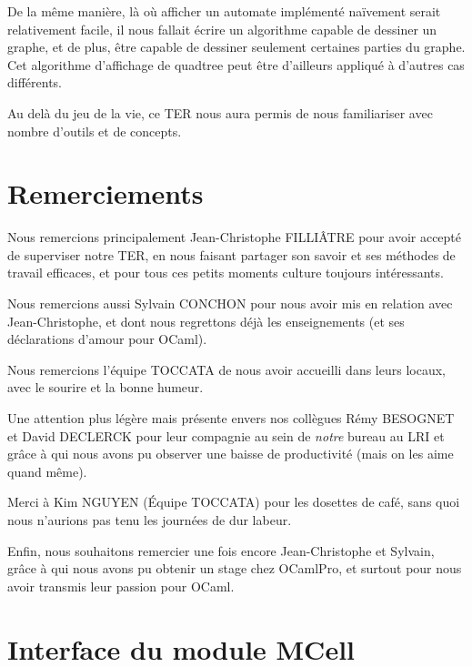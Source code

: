 \documentclass[a4paper,12pt]{report}
\begin{document}
\medskip

De la même manière, là où afficher un automate implémenté naïvement
serait relativement facile, il nous fallait écrire un algorithme
capable de dessiner un graphe, et de plus, être capable de dessiner
seulement certaines parties du graphe. Cet algorithme d'affichage de
quadtree peut être d'ailleurs appliqué à d'autres cas différents.

Au delà du jeu de la vie, ce TER nous aura permis de nous familiariser
avec nombre d'outils et de concepts.

\chapter{Remerciements}

Nous remercions principalement Jean-Christophe FILLIÂTRE pour avoir
accepté de superviser notre TER, en nous faisant partager son savoir
et ses méthodes de travail efficaces, et pour tous ces petits moments
culture toujours intéressants.

\medskip

Nous remercions aussi Sylvain CONCHON pour nous avoir mis en relation avec
Jean-Christophe, et dont nous regrettons déjà les enseignements (et ses
déclarations d'amour pour OCaml).

\medskip

Nous remercions l'équipe TOCCATA de nous avoir accueilli dans leurs
locaux, avec le sourire et la bonne humeur.

\medskip

Une attention plus légère mais présente envers nos collègues Rémy
BESOGNET et David DECLERCK pour leur compagnie au sein de
\textit{notre} bureau au LRI et grâce à qui nous avons pu observer une baisse de
productivité (mais on les aime quand même).

\medskip

Merci à Kim NGUYEN (Équipe TOCCATA) pour les dosettes de café, sans
quoi nous n'aurions pas tenu les journées de dur labeur.

\medskip

Enfin, nous souhaitons remercier une fois encore Jean-Christophe et Sylvain,
grâce à qui nous avons pu obtenir un stage chez OCamlPro, et surtout pour nous
avoir transmis leur passion pour OCaml.

\appendix

\chapter{Interface du module MCell}


\end{document}
